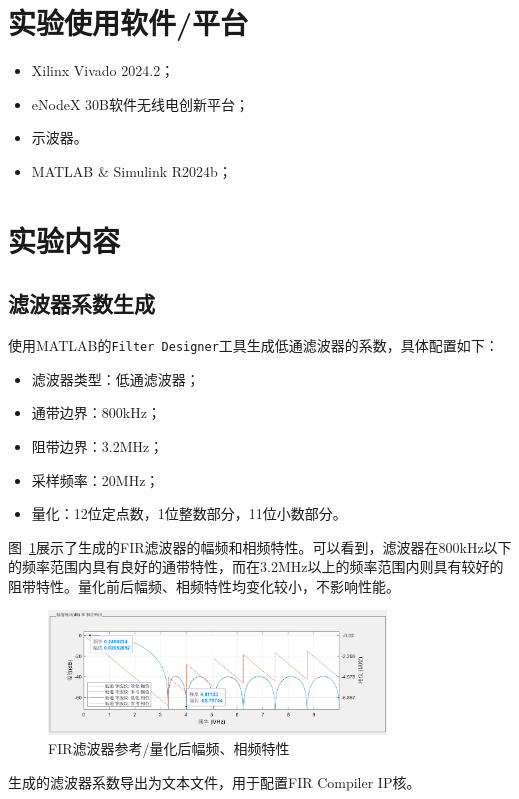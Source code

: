 \section{实验使用软件/平台}
\begin{itemize}
    \item Xilinx Vivado 2024.2；
    \item eNodeX 30B软件无线电创新平台；
    \item 示波器。
    \item MATLAB \& Simulink R2024b；
  \end{itemize}
\section{实验内容}
\subsection{滤波器系数生成}
使用MATLAB的\texttt{Filter Designer}工具生成低通滤波器的系数，具体配置如下：
\begin{itemize}
    \item 滤波器类型：低通滤波器；
    \item 通带边界：800kHz；
    \item 阻带边界：3.2MHz；
    \item 采样频率：20MHz；
    \item 量化：12位定点数，1位整数部分，11位小数部分。
\end{itemize}

图~\ref{fig:filter_coefficients}展示了生成的FIR滤波器的幅频和相频特性。可以看到，滤波器在800kHz以下的频率范围内具有良好的通带特性，而在3.2MHz以上的频率范围内则具有较好的阻带特性。量化前后幅频、相频特性均变化较小，不影响性能。
\begin{figure}[htbp]
    \centering
    \includegraphics[width=0.8\textwidth]{figure/exp7/filterDesign.png}
    \caption{FIR滤波器参考/量化后幅频、相频特性}
    \label{fig:filter_coefficients}
\end{figure}

生成的滤波器系数导出为文本文件，用于配置FIR Compiler IP核。

